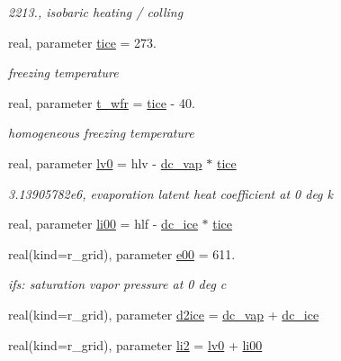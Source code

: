 \begin{DoxyCompactItemize}
\begin{DoxyCompactList}\small\item\em 2213., isobaric heating / colling \end{DoxyCompactList}\item 
real, parameter \hyperlink{classfv__cmp__mod_a7ad671e67cd91ec927c0392e32bf5d7e}{tice} = 273.
\begin{DoxyCompactList}\small\item\em freezing temperature \end{DoxyCompactList}\item 
real, parameter \hyperlink{classfv__cmp__mod_a4fe62a9a87a3aa5466fa0afe5ceb070a}{t\-\_\-wfr} = \hyperlink{classfv__cmp__mod_a7ad671e67cd91ec927c0392e32bf5d7e}{tice} -\/ 40.
\begin{DoxyCompactList}\small\item\em homogeneous freezing temperature \end{DoxyCompactList}\item 
real, parameter \hyperlink{classfv__cmp__mod_ac555be1714d90016ac1b76bd0274fe4d}{lv0} = hlv -\/ \hyperlink{classfv__cmp__mod_abc256ef2779554c3fcc3d90607dbe03d}{dc\-\_\-vap} $\ast$ \hyperlink{classfv__cmp__mod_a7ad671e67cd91ec927c0392e32bf5d7e}{tice}
\begin{DoxyCompactList}\small\item\em 3.\-13905782e6, evaporation latent heat coefficient at 0 deg k \end{DoxyCompactList}\item 
real, parameter \hyperlink{classfv__cmp__mod_aaec2280440ca71e72b152db42e5c4504}{li00} = hlf -\/ \hyperlink{classfv__cmp__mod_afe0a80520aff4b3aa44554dcbc54ccda}{dc\-\_\-ice} $\ast$ \hyperlink{classfv__cmp__mod_a7ad671e67cd91ec927c0392e32bf5d7e}{tice}
\item 
real(kind=r\-\_\-grid), parameter \hyperlink{classfv__cmp__mod_a92f0cf9784defdd98bcf50329e7f6e8b}{e00} = 611.
\begin{DoxyCompactList}\small\item\em ifs\-: saturation vapor pressure at 0 deg c \end{DoxyCompactList}\item 
real(kind=r\-\_\-grid), parameter \hyperlink{classfv__cmp__mod_adb9c6f0494c4e168f9730598a667d15a}{d2ice} = \hyperlink{classfv__cmp__mod_abc256ef2779554c3fcc3d90607dbe03d}{dc\-\_\-vap} + \hyperlink{classfv__cmp__mod_afe0a80520aff4b3aa44554dcbc54ccda}{dc\-\_\-ice}
\item 
real(kind=r\-\_\-grid), parameter \hyperlink{classfv__cmp__mod_a9248700d4484999739228f7448428746}{li2} = \hyperlink{classfv__cmp__mod_ac555be1714d90016ac1b76bd0274fe4d}{lv0} + \hyperlink{classfv__cmp__mod_aaec2280440ca71e72b152db42e5c4504}{li00}

\end{DoxyCompactItemize}
